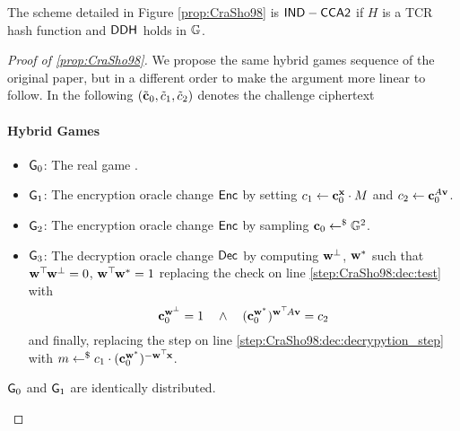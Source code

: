 \begin{proposition}
	\label{prop:CraSho98}
	The scheme detailed in Figure \ref{prop:CraSho98} is $\mathsf{IND-CCA2}$ if $H$ is a TCR hash function and $\mathsf{DDH}^{}$ holds in $\mathbb{G}$.
\end{proposition}

\begin{proof}[Proof of \ref{prop:CraSho98}]
	We propose the same hybrid games sequence of the original paper, but in a different order to make the argument more linear to follow.
	In the following $(\tilde{\mathbf{c}}_0, \tilde{c}_1, \tilde{c}_2)$ denotes the challenge ciphertext
	
	\paragraph{Hybrid Games}
	\begin{itemize}
	\item $\mathsf{G}_0$: The real game .
	
	\item $\mathsf{G}_1$: The encryption oracle change $\mathsf{Enc}$ by setting $c_1 \gets \mathbf{c}_0^{\mathbf{x}} \cdot M$ and $c_2 \gets \mathbf{c}_0^{A \mathbf{v}}$.
	
	\item $\mathsf{G}_2$: The encryption oracle change $\mathsf{Enc}$ by sampling $\mathbf{c}_0 \gets^{\$} \mathbb{G}^2$.
	
	
	\item $\mathsf{G}_3$: The decryption oracle change $\mathsf{Dec}$ by computing $\mathbf{w}^\perp$, $\mathbf{w}^\ast$ such that $\mathbf{w}^\top\hspace{-.1em} \mathbf{w}^\perp = 0$, $\mathbf{w}^\top\hspace{-.1em} \mathbf{w}^\ast = 1$ replacing the check on line \ref{step:CraSho98:dec:test} with
	\[
		\mathbf{c}_0^{\mathbf{w}^\perp} = 1
			\quad \wedge \quad
		(\mathbf{c}_0^{\mathbf{w}^\ast})^{\mathbf{w}^\top\hspace{-.1em} A \mathbf{v}} = c_2
	\]
	and finally, replacing the step on line \ref{step:CraSho98:dec:decrypytion_step} with $m \gets^{\$} c_1 \cdot (\mathbf{c}_0^{\mathbf{w}^\ast})^{-\mathbf{w}^\top\hspace{-.1em} \mathbf{x}}$.
	
	\end{itemize}
	
\begin{claim}
	\label{claim:CraSho98:G0-G1}
	$\mathsf{G}_0$ and $\mathsf{G}_1$ are identically distributed.
\end{claim}


\end{proof}
